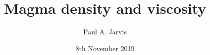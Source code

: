 \documentclass{beamer}
\title[Modeling volcanic processes]{Magma density and viscosity} %
\author[Paul Jarvis]{Paul A. Jarvis} %
\institute[UNIGE] %
{
\textit{paul.jarvis@unige.ch} %
}
\date{8th November 2019} %
\begin{document}
\begin{frame}
\titlepage %
\end{frame}





\end{document}

